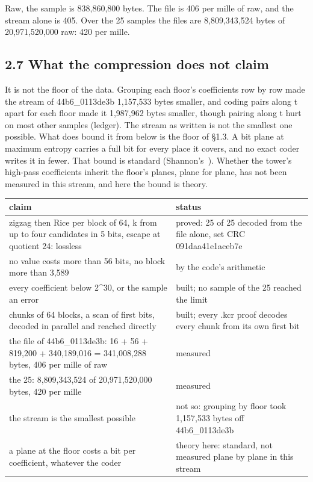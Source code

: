 Raw, the sample is 838,860,800 bytes. The file is 406 per mille of raw, and the stream alone is 405. Over the 25 samples the files are 8,809,343,524 bytes of 20,971,520,000 raw: 420 per mille.

\subsection{\texorpdfstring{2.7 What the compression does not claim}{2.7 What the compression does not claim}}

It is not the floor of the data. Grouping each floor's coefficients row by row made the stream of 44b6\_\allowbreak{}0113de3b 1,157,533 bytes smaller, and coding pairs along t apart for each floor made it 1,987,962 bytes smaller, though pairing along t hurt on most other samples (ledger). The stream as written is not the smallest one possible. What does bound it from below is the floor of §1.3. A bit plane at maximum entropy carries a full bit for every place it covers, and no exact coder writes it in fewer. That bound is standard (Shannon's~\cite{src:Shannon}). Whether the tower's high-pass coefficients inherit the floor's planes, plane for plane, has not been measured in this stream, and here the bound is theory.

{\small
\setlength{\tabcolsep}{6pt}
\begin{longtable}{>{\RaggedRight\arraybackslash}p{}>{\RaggedRight\arraybackslash}p{}}
\toprule
claim & status \\
\midrule
\endhead
zigzag then Rice per block of 64, k from up to four candidates in 5 bits, escape at quotient 24: lossless & proved: 25 of 25 decoded from the file alone, set CRC 091daa41e1aceb7e \\
no value costs more than 56 bits, no block more than 3,589 & by the code's arithmetic \\
every coefficient below 2\textasciicircum{}30, or the sample an error & built; no sample of the 25 reached the limit \\
chunks of 64 blocks, a scan of first bits, decoded in parallel and reached directly & built; every .kcr proof decodes every chunk from its own first bit \\
the file of 44b6\_\allowbreak{}0113de3b: 16 + 56 + 819,200 + 340,189,016 = 341,008,288 bytes, 406 per mille of raw & measured \\
the 25: 8,809,343,524 of 20,971,520,000 bytes, 420 per mille & measured \\
the stream is the smallest possible & not so: grouping by floor took 1,157,533 bytes off 44b6\_\allowbreak{}0113de3b \\
a plane at the floor costs a bit per coefficient, whatever the coder & theory here: standard, not measured plane by plane in this stream \\
\bottomrule
\end{longtable}
}

